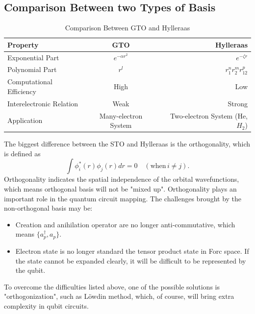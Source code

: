 \subsection{Comparison Between two Types of Basis}
\begin{table}[h!]
    \centering
    \caption{Comparison Between GTO and Hylleraas}
    \label{tab:GTO&Hylleraas}
    \begin{tabular}{lcr}
        \toprule
        \hline
        Property & GTO & Hylleraas \\
        \hline
        \midrule
        Exponential Part & $e^{-\alpha r^2}$ & $e^{-\zeta r}$ \\
        \midrule 
        Polynomial Part & $r^l$ & $r^n_1r^m_2r^p_{12}$ \\
        \midrule 
        Computational Efficiency & High & Low \\
        \midrule 
        Interelectronic Relation & Weak & Strong \\
        \midrule
        Application & Many-electron System & Two-electron System (He, $H_2$)\\
        \bottomrule
    \end{tabular}
\end{table}
The biggest difference between the STO and Hylleraas is the orthogonality, which is defined as
\begin{equation}
    \int\phi^*_i(r)\phi_j(r)dr=0 \quad (\text{when} \, i\neq j).
\end{equation}
Orthogonality indicates the spatial independence of the orbital wavefunctions, which means orthogonal basis will not be "mixed up". Orthogonality plays an important role in the quantum circuit mapping. The challenges brought by the non-orthogonal basis may be:
\begin{itemize}
    \item Creation and anihilation operator are no longer anti-commutative, which means $\{a^\dagger_p,a_p\}$.
    \item Electron state is no longer standard the tensor product state in Forc space. If the state cannot be expanded clearly, it will be difficult to be represented by the qubit.
\end{itemize}
To overcome the difficulties listed above, one of the possible solutions is "orthogonization", such as L\"{o}wdin method, which, of course, will bring extra complexity in qubit circuits.